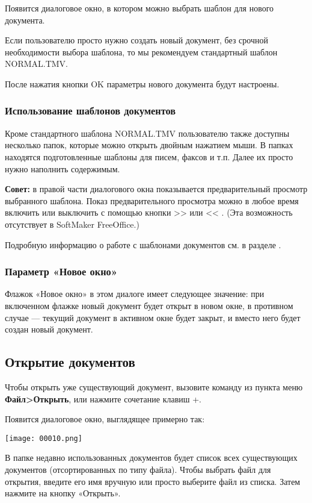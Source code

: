 ﻿\documentclass[a4paper,10pt]{article}
\begin{document}
Появится диалоговое окно, в котором можно выбрать шаблон для нового документа. 

Если пользователю просто нужно создать новый документ, без срочной необходимости выбора шаблона, то мы рекомендуем стандартный шаблон NORMAL.TMV.

После нажатия кнопки OK параметры нового документа будут настроены.

\subsubsection{Использование шаблонов документов}
Кроме стандартного шаблона NORMAL.TMV пользователю также доступны несколько папок, которые можно открыть двойным нажатием мыши. В папках находятся подготовленные шаблоны для писем, факсов и т.п. Далее их просто нужно наполнить содержимым.

\begin{mdframed}[backgroundcolor=blue!10]
\textbf{Совет:} в правой части диалогового окна показывается предварительный просмотр выбранного шаблона. Показ предварительного просмотра можно в любое время включить или выключить с помощью кнопки >> или << . (Эта возможность отсутствует в SoftMaker FreeOffice.) 
\end{mdframed}

Подробную информацию о работе с шаблонами документов см. в разделе .

\subsubsection{Параметр «Новое окно»}
Флажок «Новое окно» в этом диалоге имеет следующее значение: при включенном флажке новый документ будет открыт в новом окне, в противном случае — текущий документ в активном окне будет закрыт, и вместо него будет создан новый документ.

\subsection{Открытие документов} \label{sec:открытиедок}
Чтобы открыть уже существующий документ, вызовите команду из пункта меню \textbf{Файл>Открыть}, или нажмите сочетание клавиш +.

Появится диалоговое окно, выглядящее примерно так: 

\texttt{[image: 00010.png]}

В папке недавно использованных документов будет список всех существующих документов (отсортированных по типу файла). Чтобы выбрать файл для открытия, введите его имя вручную или просто выберите файл из списка. Затем нажмите на кнопку «Открыть».
\end{document}
